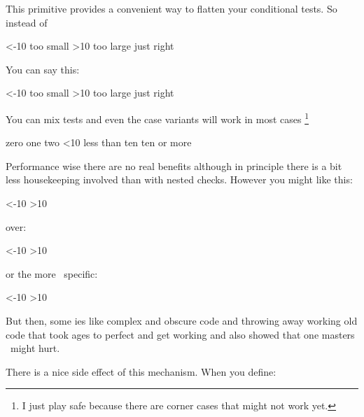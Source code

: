 \stopoldprimitive

\startnewprimitive[title={\prm {orelse}}]

This primitive provides a convenient way to flatten your conditional tests. So
instead of

\starttyping
\ifnum\scratchcounter<-10
    too small
\else\ifnum\scratchcounter>10
    too large
\else
    just right
\fi\fi
\stoptyping

You can say this:

\starttyping
\ifnum\scratchcounter<-10
    too small
\orelse\ifnum\scratchcounter>10
    too large
\else
    just right
\fi
\stoptyping

You can mix tests and even the case variants will work in most cases \footnote {I
just play safe because there are corner cases that might not work yet.}

\starttyping
\ifcase\scratchcounter          zero
\or                             one
\or                             two
\orelse\ifnum\scratchcounter<10 less than ten
\else                           ten or more
\fi
\stoptyping

Performance wise there are no real benefits although in principle there is a bit
less housekeeping involved than with nested checks. However you might like this:

\starttyping
\ifnum\scratchcounter<-10
    \expandafter\toosmall
\orelse\ifnum\scratchcounter>10
    \expandafter\toolarge
\else
    \expandafter\justright
\fi
\stoptyping

over:

\starttyping
\ifnum\scratchcounter<-10
    \expandafter\toosmall
\else\ifnum\scratchcounter>10
    \expandafter\expandafter\expandafter\toolarge
\else
    \expandafter\expandafter\expandafter\justright
\fi\fi
\stoptyping

or the more \CONTEXT\ specific:

\starttyping
\ifnum\scratchcounter<-10
    \expandafter\toosmall
\else\ifnum\scratchcounter>10
    \doubleexpandafter\toolarge
\else
    \doubleexpandafter\justright
\fi\fi
\stoptyping

But then, some \TEX ies like complex and obscure code and throwing away working
old code that took ages to perfect and get working and also showed that one
masters \TEX\ might hurt.

There is a nice side effect of this mechanism. When you define:

\starttyping
\def\quitcondition{\orelse\iffalse}
\stoptyping

